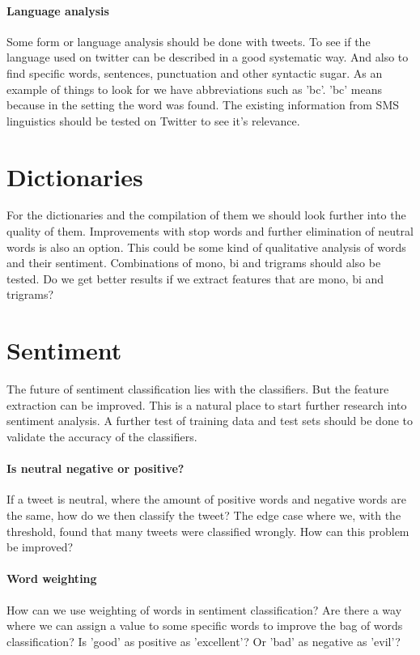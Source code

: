 \paragraph{Language analysis}
Some form or language analysis should be done with tweets. To see if the
language used on twitter can be described in a good systematic way. And also to
find specific words, sentences, punctuation and other syntactic sugar. 
As an example of things to look for we have abbreviations such as 'bc'. 'bc'
means because in the setting the word was found. The existing information from
SMS linguistics should be tested on Twitter to see it's relevance.
%

\section{Dictionaries}\label{future_work:dictionaries}
For the dictionaries and the compilation of them we should look further into
the quality of them. Improvements with stop words and further elimination of
neutral words is also an option. This could be some kind of qualitative
analysis of words and their sentiment. Combinations of mono, bi and trigrams
should also be tested. Do we get better results if we extract features that are
mono, bi and trigrams? 
%

\section{Sentiment}\label{future_work:sentiment}
The future of sentiment classification lies with the classifiers. But the
feature extraction can be improved. This is a natural place to start further
research into sentiment analysis. A further test of training data and test sets
should be done to validate the accuracy of the classifiers.   
 
\paragraph{Is neutral negative or positive?}
If a tweet is neutral, where the amount of positive words and
negative words are the same, how do we then classify the tweet? The edge case
where we, with the threshold, found that many tweets were classified wrongly.
How can this problem be improved?

\paragraph{Word weighting}
How can we use weighting of words in sentiment classification? Are there a way
where we can assign a value to some specific words to improve the bag of words
classification? Is 'good' as positive as 'excellent'? Or 'bad' as negative as
'evil'? 

